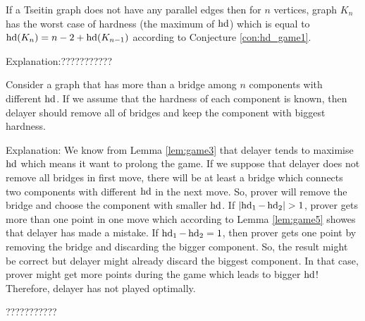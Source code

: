 \documentclass[]{book}
\begin{document}
\begin{conj}\label{con:hd_game2}
     If a Tseitin graph does not have any parallel edges then for $n$ vertices, graph $K_n$ has the worst case of hardness 
	 (the maximum of $\operatorname{hd}$) which is equal to $\operatorname{hd}(K_n)= n-2+\operatorname{hd}(K_{n-1})$ according to Conjecture  \ref{con:hd_game1}.
	 
	 Explanation:???????????
\end{conj}

\begin{conj}\label{con:hd_game3}
           Consider a graph that has more than a bridge among $n$ components with different $\operatorname{hd}$. If we assume that 
		   the hardness of each component is known, then delayer should remove all of bridges and keep the component with 
		   biggest hardness.
		   
		   Explanation: We know from Lemma \ref{lem:game3} that delayer tends to maximise $\operatorname{hd}$ which means it want to prolong
		   the game. If we suppose that delayer does not remove all bridges in first move, there will be at least a bridge which 
		   connects two components with different $\operatorname{hd}$ in the next move. So, prover will remove the bridge and choose the
		   component with smaller $\operatorname{hd}$. If $ \lvert \operatorname{hd}_1- \operatorname{hd}_2  \rvert > 1$, prover gets more than one point in one move
		   which according to Lemma \ref{lem:game5} showes that delayer has made a mistake. If $\operatorname{hd}_1- \operatorname{hd}_2  = 1$, then
		   prover gets one point by removing the bridge and discarding the bigger component. So, the result might be correct but 
		   delayer might already discard the biggest component. In that case, prover might get more points during the game which leads 
		   to bigger $\operatorname{hd}$! Therefore, delayer has not played optimally.
		   
		   ???????????		   
\end{conj}
\end{document}
